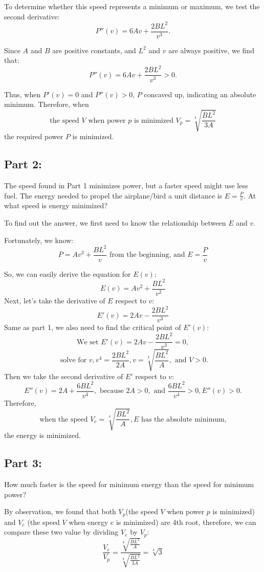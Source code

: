 \documentclass{article}
\begin{document}
To determine whether this speed represents a minimum or maximum, we test the second derivative:
\[
P''(v) = 6Av + \frac{2BL^2}{v^3}.
\]

Since \( A \) and \( B \) are positive constants, and \( L^2 \) and \( v \) are always positive, we find that:
\[
P''(v) = 6Av + \frac{2BL^2}{v^3} > 0.
\]

Thus, when \( P'(v) = 0 \) and \( P''(v) > 0 \), \( P \) concaved up, indicating an absolute minimum. Therefore, when
\[
\text{the speed } V \text{ when power } p \text{ is minimized }  V_p = \sqrt[4]{\frac{BL^2}{3A}}
\]
the required power \( P \) is minimized.

\subsection*{Part 2:}
The speed found in Part 1 minimizes power, but a faster speed might use less fuel. The energy needed to propel the airplane/bird a unit distance is \( E = \frac{P}{v} \). At what speed is energy minimized?

To find out the answer, we first need to know the relationship between \( E \) and \( v \). 

Fortunately, we know:
\[
P = Av^3 + \frac{BL^2}{v} \text{ from the beginning, and }
E = \frac{P}{v}
\]

So, we can easily derive the equation for \( E(v) \):
\[
E(v) = Av^2 + \frac{BL^2}{v^2}
\]
Next, let's take the derivative of \(E\) respect to \(v\):
\[
E'(v) = 2Av-\frac{2BL^2}{v^3}
\]
Same as part 1, we also need to find the critical point of \(E'(v)\):
\[\text{We set } E'(v) = 2Av-\frac{2BL^2}{v^3} = 0,\]
\[\text{ solve for }v, v^4=\frac{2BL^2}{2A}, v = \sqrt[4]{\frac{BL^2}{A}},\text{ and }V > 0.\]
Then we take the second derivative of \(E'\) respect to \(v\):
\[E''(v) = 2A + \frac{6BL^2}{v^4},
\text{ because } 2A > 0, \text{ and } \frac{6BL^2}{v^4} > 0, E''(v) > 0.\]
Therefore,
 \[\text{when the speed }V_e = \sqrt[4]{\frac{BL^2}{A}}, E\text{ has the absolute minimum,}\]
  the energy is minimized.

\subsection*{Part 3:}
How much faster is the speed for minimum energy than the speed for minimum power?
\setlength{\parskip}{1em}

By observation, we found that both \(V_p\)(the speed \(V\) when power \(p\) is minimized) and \(V_e\) (the speed \(V\) when energy \(e\) is minimized) are 4th root, therefore, we can compare these two value by dividing \(V_e\) by \(V_p\):
\[\frac{V_e}{V_p}=\frac{\sqrt[4]{\frac{BL^2}{A}}}{\sqrt[4]{\frac{BL^2}{3A}}} = \sqrt[4]{3}\]
\end{document}
